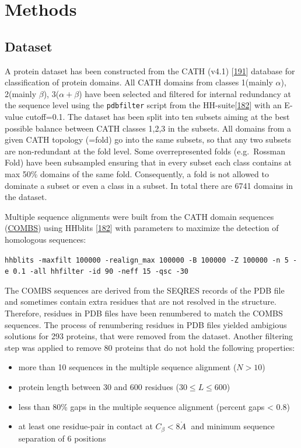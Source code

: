 \documentclass[11pt,a4paper,twoside]{book}
\providecommand{\tightlist}{%
  \setlength{\itemsep}{0pt}\setlength{\parskip}{0pt}}
\newcommand{\angstrom}{\mathring{A} \;}
\theoremstyle{definition}
\theoremstyle{definition}
\theoremstyle{remark}
\begin{document}
\newpage 

\section{Methods}\label{methods}

\subsection{Dataset}\label{dataset}

A protein dataset has been constructed from the CATH (v4.1)
{[}\protect\hyperlink{ref-Sillitoe2015}{191}{]} database for
classification of protein domains. All CATH domains from classes
1(mainly \(\alpha\)), 2(mainly \(\beta\)), 3(\(\alpha+\beta\)) have been
selected and filtered for internal redundancy at the sequence level
using the \texttt{pdbfilter} script from the
HH-suite{[}\protect\hyperlink{ref-Remmert2012}{182}{]} with an E-value
cutoff=0.1. The dataset has been split into ten subsets aiming at the
best possible balance between CATH classes 1,2,3 in the subsets. All
domains from a given CATH topology (=fold) go into the same subsets, so
that any two subsets are non-redundant at the fold level. Some
overrepresented folds (e.g.~Rossman Fold) have been subsampled ensuring
that in every subset each class contains at max 50\% domains of the same
fold. Consequently, a fold is not allowed to dominate a subset or even a
class in a subset. In total there are 6741 domains in the dataset.

Multiple sequence alignments were built from the CATH domain sequences
(\href{http://www.cathdb.info/version/current/domain/3cdjA03/sequence}{COMBS})
using HHblits {[}\protect\hyperlink{ref-Remmert2012}{182}{]} with
parameters to maximize the detection of homologous sequences:

\texttt{hhblits\ -maxfilt\ 100000\ -realign\_max\ 100000\ -B\ 100000\ -Z\ 100000\ -n\ 5\ -e\ 0.1\ -all\ hhfilter\ -id\ 90\ -neff\ 15\ -qsc\ -30}

The COMBS sequences are derived from the SEQRES records of the PDB file
and sometimes contain extra residues that are not resolved in the
structure. Therefore, residues in PDB files have been renumbered to
match the COMBS sequences. The process of renumbering residues in PDB
files yielded ambigious solutions for 293 proteins, that were removed
from the dataset. Another filtering step was applied to remove 80
proteins that do not hold the following properties:

\begin{itemize}
\tightlist
\item
  more than 10 sequences in the multiple sequence alignment (\(N>10\))
\item
  protein length between 30 and 600 residues (\(30 \leq L \leq 600\))
\item
  less than 80\% gaps in the multiple sequence alignment (percent gaps
  \textless{} 0.8)
\item
  at least one residue-pair in contact at \(C_\beta < 8\angstrom\) and
  minimum sequence separation of 6 positions
\end{itemize}
\end{document}
